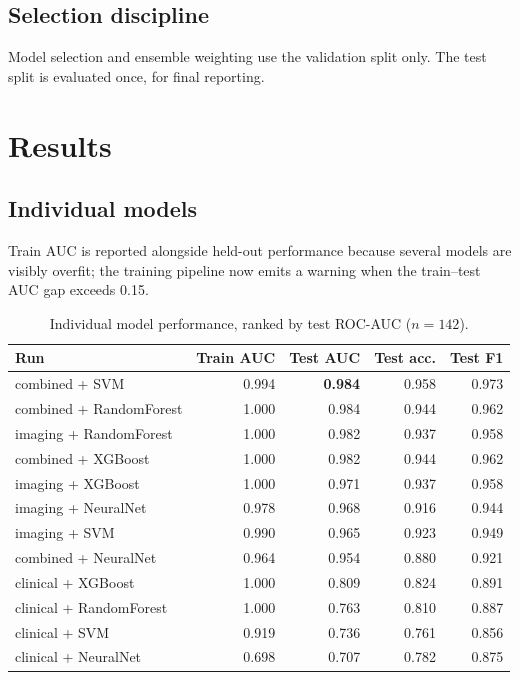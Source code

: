 \documentclass[11pt,a4paper]{article}
\begin{document}
\subsection{Selection discipline}

Model selection and ensemble weighting use the validation split only. The test
split is evaluated once, for final reporting.

\section{Results}

\subsection{Individual models}

Train AUC is reported alongside held-out performance because several models are
visibly overfit; the training pipeline now emits a warning when the
train--test AUC gap exceeds 0.15.

\begin{table}[h]
\centering
\begin{tabular}{@{}l r r r r@{}}
\toprule
\textbf{Run} & \textbf{Train AUC} & \textbf{Test AUC} & \textbf{Test acc.} & \textbf{Test F1} \\
\midrule
combined + SVM            & 0.994 & \textbf{0.984} & 0.958 & 0.973 \\
combined + RandomForest   & 1.000 & 0.984 & 0.944 & 0.962 \\
imaging + RandomForest    & 1.000 & 0.982 & 0.937 & 0.958 \\
combined + XGBoost        & 1.000 & 0.982 & 0.944 & 0.962 \\
imaging + XGBoost         & 1.000 & 0.971 & 0.937 & 0.958 \\
imaging + NeuralNet       & 0.978 & 0.968 & 0.916 & 0.944 \\
imaging + SVM             & 0.990 & 0.965 & 0.923 & 0.949 \\
combined + NeuralNet      & 0.964 & 0.954 & 0.880 & 0.921 \\
clinical + XGBoost        & 1.000 & 0.809 & 0.824 & 0.891 \\
clinical + RandomForest   & 1.000 & 0.763 & 0.810 & 0.887 \\
clinical + SVM            & 0.919 & 0.736 & 0.761 & 0.856 \\
clinical + NeuralNet      & 0.698 & 0.707 & 0.782 & 0.875 \\
\bottomrule
\end{tabular}
\caption{Individual model performance, ranked by test ROC-AUC ($n=142$).}
\label{tab:models}
\end{table}
\end{document}
